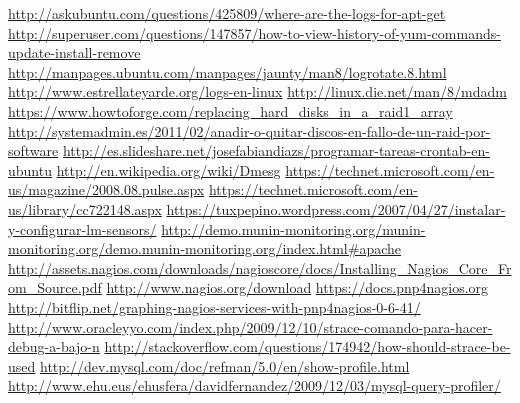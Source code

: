 \documentclass[a4paper, 11pt]{article} %
\begin{document}
\begin{thebibliography}{99}
 \url{http://askubuntu.com/questions/425809/where-are-the-logs-for-apt-get}
 \url{http://superuser.com/questions/147857/how-to-view-history-of-yum-commands-update-install-remove}
 \url{http://manpages.ubuntu.com/manpages/jaunty/man8/logrotate.8.html}
 \url{http://www.estrellateyarde.org/logs-en-linux}
 \url{http://linux.die.net/man/8/mdadm}
 \url{https://www.howtoforge.com/replacing_hard_disks_in_a_raid1_array}
 \url{http://systemadmin.es/2011/02/anadir-o-quitar-discos-en-fallo-de-un-raid-por-software}
 \url{http://es.slideshare.net/josefabiandiazs/programar-tareas-crontab-en-ubuntu}
 \url{http://en.wikipedia.org/wiki/Dmesg}
 \url{https://technet.microsoft.com/en-us/magazine/2008.08.pulse.aspx}
 \url{https://technet.microsoft.com/en-us/library/cc722148.aspx}
 \url{https://tuxpepino.wordpress.com/2007/04/27/instalar-y-configurar-lm-sensors/}
 \url{http://demo.munin-monitoring.org/munin-monitoring.org/demo.munin-monitoring.org/index.html#apache}
 \url{http://assets.nagios.com/downloads/nagioscore/docs/Installing_Nagios_Core_From_Source.pdf}
 \url{http://www.nagios.org/download}
 \url{https://docs.pnp4nagios.org}
 \url{http://bitflip.net/graphing-nagios-services-with-pnp4nagios-0-6-41/}
 \url{http://www.oracleyyo.com/index.php/2009/12/10/strace-comando-para-hacer-debug-a-bajo-n}
 \url{http://stackoverflow.com/questions/174942/how-should-strace-be-used}
 \url{http://dev.mysql.com/doc/refman/5.0/en/show-profile.html}
 \url{http://www.ehu.eus/ehusfera/davidfernandez/2009/12/03/mysql-query-profiler/}
\end{thebibliography}
\end{document}
